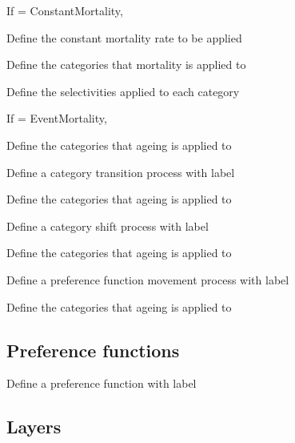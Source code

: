 If  = ConstantMortality, 

 {Define the constant mortality rate to be applied}

 {Define the categories that mortality is applied to}

 {Define the selectivities applied to each category}

If  = EventMortality, 

 {Define the categories that ageing is applied to}






 {Define a category transition process with label}

 {Define the categories that ageing is applied to}

 {Define a category shift process with label}

 {Define the categories that ageing is applied to}

 {Define a preference function movement process with label}

 {Define the categories that ageing is applied to}

\subsection{Preference functions}

 {Define a preference function with label}

\subsection{Layers}

